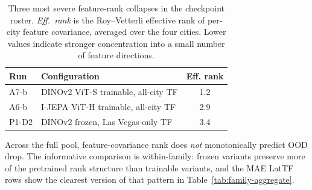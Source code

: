 \begin{table}[ht]
\centering
\caption[Most severe feature-rank collapses in the mechanistic roster.]{Three most severe feature-rank collapses in the checkpoint roster. \emph{Eff.\ rank} is the Roy--Vetterli effective rank of per-city feature covariance, averaged over the four cities. Lower values indicate stronger concentration into a small number of feature directions.}
\label{tab:exp-rank-collapse}
\small
\renewcommand{\arraystretch}{1.15}
\setlength{\tabcolsep}{6pt}
\begin{tabular}{@{}>{\raggedright\arraybackslash}p{2.6cm} >{\raggedright\arraybackslash}p{5.6cm} c@{}}
\toprule
\textbf{Run} & \textbf{Configuration} & \textbf{Eff. rank} \\
\midrule
A7-b & DINOv2 ViT-S trainable, all-city TF & 1.2 \\
A6-b & I-JEPA ViT-H trainable, all-city TF & 2.9 \\
P1-D2 & DINOv2 frozen, Las Vegas-only TF & 3.4 \\
\bottomrule
\end{tabular}
\end{table}

Across the full pool, feature-covariance rank does \emph{not} monotonically predict OOD drop. The informative comparison is within-family: frozen variants preserve more of the pretrained rank structure than trainable variants, and the MAE LatTF rows show the clearest version of that pattern in Table~\ref{tab:family-aggregate}.


